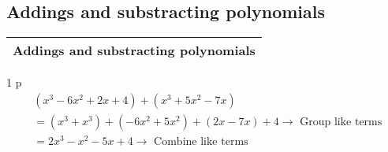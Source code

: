 \subsection{Addings and substracting polynomials}
\begin{small}
    \begin{tabularx}{1\textwidth}{
            p{}
        }
        \toprule
        Addings and substracting polynomials
        \\
        \bottomrule

    \end{tabularx}
\end{small}
\begin{small}
    \begin{tabularx}{1\textwidth}{
            p{}
        }
        \toprule
        \[
        \begin{aligned}
            &\left(x^3-6x^2+2x+4\right) + \left(x^3+5x^2-7x\right) \\
                &= \left(x^3+x^3\right) + \left(-6x^2+5x^2\right) + \left(2x-7x\right) + 4 \rightarrow \text{ Group like terms }\\
                &= 2x^3-x^2-5x+4 \rightarrow \text{ Combine like terms }\\
        \end{aligned}
        \]
        \\
        \bottomrule
    \end{tabularx}
\end{small}
